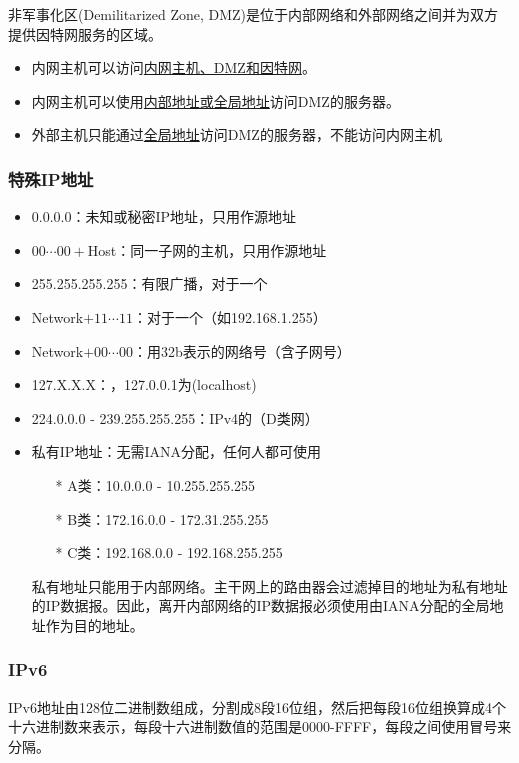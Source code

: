 \myhline
非军事化区(Demilitarized Zone, DMZ)是位于内部网络和外部网络之间并为双方提供因特网服务的区域。
\begin{itemize}
\item 内网主机可以访问\underline{内网主机、DMZ和因特网}。
\item 内网主机可以使用\underline{内部地址或全局地址}访问DMZ的服务器。
\item 外部主机只能通过\underline{全局地址}访问DMZ的服务器，不能访问内网主机
\end{itemize}

\subsubsection{特殊IP地址}
\begin{itemize}
	\item 0.0.0.0：未知或秘密IP地址，只用作源地址
	\item $00\cdots00+$Host：同一子网的主机，只用作源地址
	\item 255.255.255.255：有限广播，对于一个
	\item Network$+11\cdots11$：对于一个（如192.168.1.255）
	\item Network$+00\cdots00$：用32b表示的网络号（含子网号）
	\item 127.X.X.X：，127.0.0.1为(localhost)
	\item 224.0.0.0 - 239.255.255.255：IPv4的（D类网）
	\item 私有IP地址：无需IANA分配，任何人都可使用
	\begin{itemize}
		\item[*] A类：10.0.0.0 - 10.255.255.255
		\item[*] B类：172.16.0.0 - 172.31.255.255
		\item[*] C类：192.168.0.0 - 192.168.255.255
	\end{itemize}
	私有地址只能用于内部网络。主干网上的路由器会过滤掉目的地址为私有地址的IP数据报。因此，离开内部网络的IP数据报必须使用由IANA分配的全局地址作为目的地址。
\end{itemize}

\subsubsection{IPv6}
IPv6地址由128位二进制数组成，分割成8段16位组，然后把每段16位组换算成4个十六进制数来表示，每段十六进制数值的范围是0000-FFFF，每段之间使用冒号来分隔。

